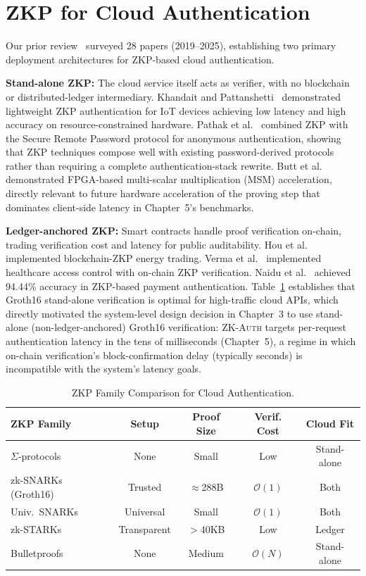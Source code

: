 \documentclass[12pt,a4paper,oneside]{report}
\begin{document}
\section{ZKP for Cloud Authentication}
\label{sec:zkp_systems}

Our prior review~\cite{dandge2025zkpcloud} surveyed 28 papers (2019--2025),
establishing two primary deployment architectures for ZKP-based cloud
authentication.

\textbf{Stand-alone ZKP:} The cloud service itself acts as verifier, with
no blockchain or distributed-ledger intermediary. Khandait and
Pattanshetti~\cite{khandait2024} demonstrated lightweight ZKP authentication
for IoT devices achieving low latency and high accuracy on
resource-constrained hardware. Pathak et al.~\cite{pathak2021} combined ZKP
with the Secure Remote Password protocol for anonymous authentication,
showing that ZKP techniques compose well with existing password-derived
protocols rather than requiring a complete authentication-stack rewrite.
Butt et al.~\cite{butt2024} demonstrated FPGA-based multi-scalar
multiplication (MSM) acceleration, directly relevant to future hardware
acceleration of the proving step that dominates client-side latency in
Chapter~5's benchmarks.

\textbf{Ledger-anchored ZKP:} Smart contracts handle proof verification
on-chain, trading verification cost and latency for public auditability.
Hou et al.~\cite{hou2022} implemented blockchain-ZKP energy trading. Verma
et al.~\cite{verma2024} implemented healthcare access control with
on-chain ZKP verification. Naidu et al.~\cite{naidu2023} achieved 94.44\%
accuracy in ZKP-based payment authentication. Table~\ref{tab:zkp_families}
establishes that Groth16 stand-alone verification is optimal for
high-traffic cloud APIs, which directly motivated the system-level design
decision in Chapter~3 to use stand-alone (non-ledger-anchored) Groth16
verification: \textsc{ZK-Auth} targets per-request authentication latency
in the tens of milliseconds (Chapter~5), a regime in which on-chain
verification's block-confirmation delay (typically seconds) is
incompatible with the system's latency goals.

\begin{table}[htbp]
\renewcommand{\arraystretch}{1.2}
\caption{ZKP Family Comparison for Cloud Authentication.}
\label{tab:zkp_families}
\centering
\begin{tabular}{lcccc}
\toprule
\textbf{ZKP Family} & \textbf{Setup} & \textbf{Proof Size} &
\textbf{Verif. Cost} & \textbf{Cloud Fit} \\
\midrule
$\Sigma$-protocols & None    & Small    & Low      & Stand-alone \\
zk-SNARKs (Groth16)& Trusted & $\approx$288B & $\mathcal{O}(1)$ & Both \\
Univ.\ SNARKs      & Universal& Small  & $\mathcal{O}(1)$ & Both \\
zk-STARKs          & Transparent& $>$40KB & Low      & Ledger \\
Bulletproofs       & None    & Medium   & $\mathcal{O}(N)$ & Stand-alone \\
\bottomrule
\end{tabular}
\end{table}
\end{document}
